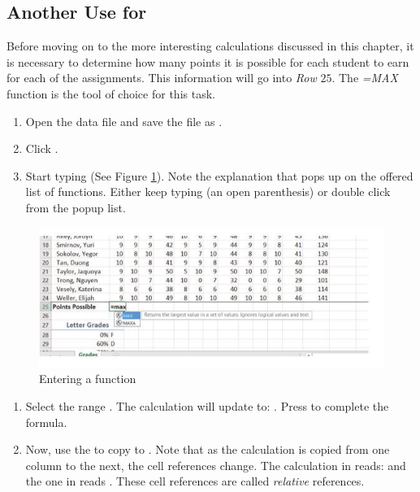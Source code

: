 \subsection{Another Use for }

Before moving on to the more interesting calculations discussed in this chapter, it is necessary to determine how many points it is possible for each student to earn for each of the assignments. This information will go into \textit{Row} $ 25 $. The \textit{=MAX} function is the tool of choice for this task.

\begin{enumerate}
	\item Open the data file  and save the file as .
	\item Click .
	\item Start typing  (See Figure \ref{03:fig02}). Note the explanation that pops up on the offered list of functions. Either keep typing \fmtTyping{(} (an open parenthesis) or double click  from the popup list.
\end{enumerate}

\begin{figure}[H]
	\centering
	\includegraphics[width=\maxwidth{.95\linewidth}]{gfx/ch03_fig02}
	\caption{Entering a function}
	\label{03:fig02}
\end{figure}

\begin{enumerate}[resume]
	\item Select the range . The calculation will update to: . Press  to complete the formula.
	\item Now, use the  to copy  to . Note that as the calculation is copied from one column to the next, the cell references change. The calculation in  reads:  and the one in  reads . These cell references are called \textit{relative} references.
\end{enumerate}

